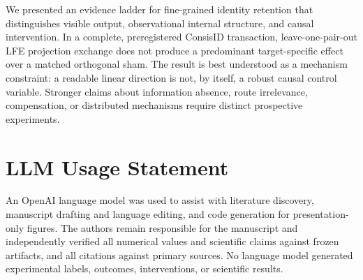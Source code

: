 \documentclass[10pt,twocolumn,letterpaper]{article}
\begin{document}
We presented an evidence ladder for fine-grained identity retention that distinguishes visible output, observational internal structure, and causal intervention.  In a complete, preregistered ConsisID transaction, leave-one-pair-out LFE projection exchange does not produce a predominant target-specific effect over a matched orthogonal sham.  The result is best understood as a mechanism constraint: a readable linear direction is not, by itself, a robust causal control variable.  Stronger claims about information absence, route irrelevance, compensation, or distributed mechanisms require distinct prospective experiments.

{\small


}

\section*{LLM Usage Statement}
An OpenAI language model was used to assist with literature discovery, manuscript drafting and language editing, and code generation for presentation-only figures.  The authors remain responsible for the manuscript and independently verified all numerical values and scientific claims against frozen artifacts, and all citations against primary sources.  No language model generated experimental labels, outcomes, interventions, or scientific results.
\end{document}
